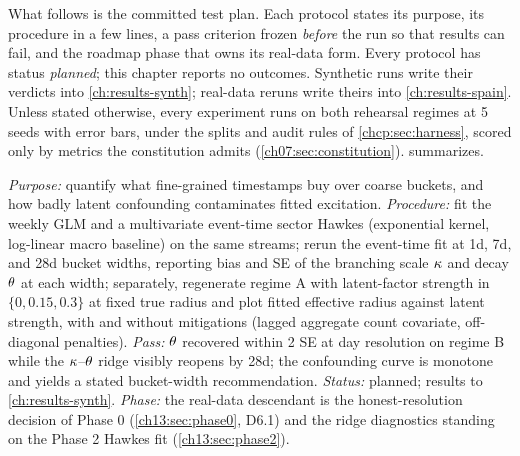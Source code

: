 What follows is the committed test plan. Each protocol states its purpose, its procedure in a few lines, a
pass criterion frozen \emph{before} the run so that results can fail, and the roadmap phase that owns its
real-data form. Every protocol has status \emph{planned}; this chapter reports no outcomes. Synthetic runs
write their verdicts into \cref{ch:results-synth}; real-data reruns write theirs into \cref{ch:results-spain}.
Unless stated otherwise, every experiment runs on both rehearsal regimes at 5 seeds with error bars, under the
splits and audit rules of \cref{chcp:sec:harness}, scored only by metrics the constitution admits
(\cref{ch07:sec:constitution}).  summarizes.

\begin{protocol}
\label{chcp:prot:e1}
\emph{Purpose:} quantify what fine-grained timestamps buy over coarse buckets, and how badly latent
confounding contaminates fitted excitation. \emph{Procedure:} fit the weekly GLM and a multivariate event-time
sector Hawkes (exponential kernel, log-linear macro baseline) on the same streams; rerun the event-time fit at
1d, 7d, and 28d bucket widths, reporting bias and SE of the branching scale $\kappa$ and decay $\theta$ at
each width; separately, regenerate regime A with latent-factor strength in $\{0, 0.15, 0.3\}$ at fixed true
radius and plot fitted effective radius against latent strength, with and without mitigations (lagged
aggregate count covariate, off-diagonal penalties). \emph{Pass:} $\theta$ recovered within 2 SE at day
resolution on regime B while the $\kappa$--$\theta$ ridge visibly reopens by 28d; the confounding curve is
monotone and yields a stated bucket-width recommendation. \emph{Status:} planned; results to
\cref{ch:results-synth}. \emph{Phase:} the real-data descendant is the honest-resolution decision of Phase 0
(\cref{ch13:sec:phase0}, D6.1) and the ridge diagnostics standing on the Phase 2 Hawkes fit
(\cref{ch13:sec:phase2}).
\end{protocol}

